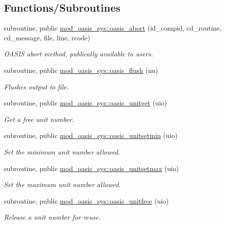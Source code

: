 \subsection*{Functions/\+Subroutines}
\begin{DoxyCompactItemize}
\item 
subroutine, public \hyperlink{namespacemod__oasis__sys_af1943a0ce0c5765ba8a714379065464f}{mod\+\_\+oasis\+\_\+sys\+::oasis\+\_\+abort} (id\+\_\+compid, cd\+\_\+routine, cd\+\_\+message, file, line, rcode)
\begin{DoxyCompactList}\small\item\em O\+A\+S\+IS abort method, publically available to users. \end{DoxyCompactList}\item 
subroutine, public \hyperlink{namespacemod__oasis__sys_ad152b6f737a7e06f8f1226af23d66361}{mod\+\_\+oasis\+\_\+sys\+::oasis\+\_\+flush} (nu)
\begin{DoxyCompactList}\small\item\em Flushes output to file. \end{DoxyCompactList}\item 
subroutine, public \hyperlink{namespacemod__oasis__sys_abce4c06d8a999919a2a185c71ab15edd}{mod\+\_\+oasis\+\_\+sys\+::oasis\+\_\+unitget} (uio)
\begin{DoxyCompactList}\small\item\em Get a free unit number. \end{DoxyCompactList}\item 
subroutine, public \hyperlink{namespacemod__oasis__sys_a063a41b73546564afd294fd5708b6667}{mod\+\_\+oasis\+\_\+sys\+::oasis\+\_\+unitsetmin} (uio)
\begin{DoxyCompactList}\small\item\em Set the minimum unit number allowed. \end{DoxyCompactList}\item 
subroutine, public \hyperlink{namespacemod__oasis__sys_a6e0a46b41f1b9f0a1dc99b17665f49dc}{mod\+\_\+oasis\+\_\+sys\+::oasis\+\_\+unitsetmax} (uio)
\begin{DoxyCompactList}\small\item\em Set the maximum unit number allowed. \end{DoxyCompactList}\item 
subroutine, public \hyperlink{namespacemod__oasis__sys_a892ed9f46e2e8f577f1a2670f74695d6}{mod\+\_\+oasis\+\_\+sys\+::oasis\+\_\+unitfree} (uio)
\begin{DoxyCompactList}\small\item\em Release a unit number for reuse. \end{DoxyCompactList}\item 

\end{DoxyCompactItemize}
